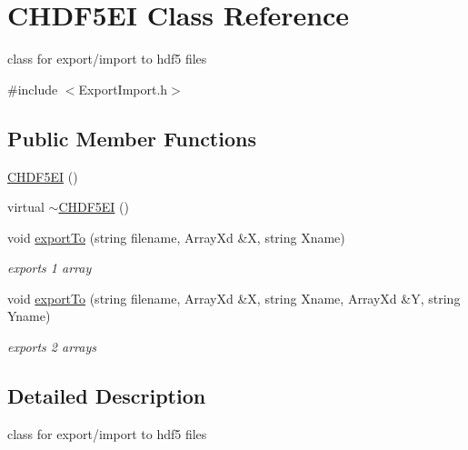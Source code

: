 \hypertarget{class_c_h_d_f5_e_i}{\section{C\-H\-D\-F5\-E\-I Class Reference}
\label{class_c_h_d_f5_e_i}
}


class for export/import to hdf5 files  




{\ttfamily \#include $<$Export\-Import.\-h$>$}

\subsection*{Public Member Functions}
\begin{DoxyCompactItemize}
\item 
\hyperlink{class_c_h_d_f5_e_i_a8b0e070ee825131070b09b8136a5dc42}{C\-H\-D\-F5\-E\-I} ()
\item 
virtual \hyperlink{class_c_h_d_f5_e_i_ae74dd8d1804cb72986abd908011589a9}{$\sim$\-C\-H\-D\-F5\-E\-I} ()
\item 
void \hyperlink{class_c_h_d_f5_e_i_ad2c3b512f666822a4123ec057eca2503}{export\-To} (string filename, Array\-Xd \&X, string Xname)
\begin{DoxyCompactList}\small\item\em exports 1 array \end{DoxyCompactList}\item 
void \hyperlink{class_c_h_d_f5_e_i_a98dcf9f0763230634340f522da71b80f}{export\-To} (string filename, Array\-Xd \&X, string Xname, Array\-Xd \&Y, string Yname)
\begin{DoxyCompactList}\small\item\em exports 2 arrays \end{DoxyCompactList}\end{DoxyCompactItemize}


\subsection{Detailed Description}
class for export/import to hdf5 files 

